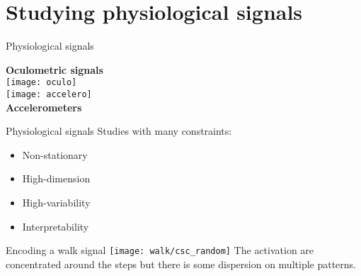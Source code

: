 \documentclass[defense.tex]{subfiles}
\begin{document}
\section{Studying physiological signals}



\begin{frame}{Physiological signals}

	\centering
	\large\textbf{Oculometric signals}\\[.2em]
	\texttt{[image: oculo]}\\[0em]
	\texttt{[image: accelero]}\\[.2em]
	\large\textbf{Accelerometers}\\[.2em]
	\biblio{}

\end{frame}

\begin{frame}{Physiological signals}
	\large
	Studies with many constraints:\\[1em]
	\begin{itemize}\itemsep.0em
		\item Non-stationary\\
		\item High-dimension\\
		\item High-variability\\
		\item Interpretability\\
	\end{itemize}
\end{frame}


\begin{frame}{Encoding a walk signal}
	\centering
	\texttt{[image: walk/csc\_random]}
	The activation are concentrated around the steps but there is some dispersion
	on multiple patterns.
\end{frame}


	
\end{document}
